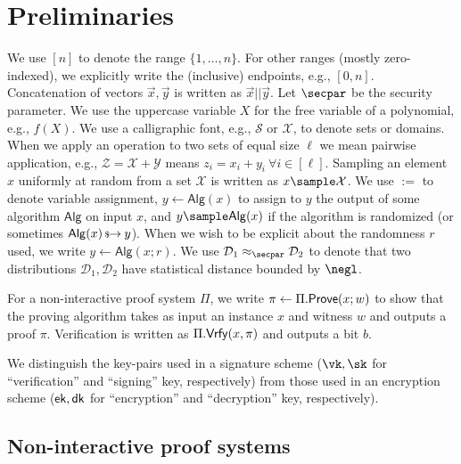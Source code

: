 \section{Preliminaries}\label{sec:prelims}

We use $[n]$ to denote the range $\{1, \dots, n\}$. For other ranges (mostly zero-indexed), we explicitly write the (inclusive) endpoints, e.g., $[0,n]$. 
Concatenation of vectors $\vec{x},\vec{y}$ is written as $\vec{x} || \vec{y}$. 
Let $\secpar$ be the security parameter.
We use the uppercase variable $X$ for the free variable of a polynomial, e.g., $f(X)$. 
We use a calligraphic font, e.g., $\mathcal{S}$ or $\mathcal{X}$, to denote sets or domains. When we apply an operation to two sets of equal size $\ell$ we mean pairwise application, e.g., $\mathcal{Z} = \mathcal{X} + \mathcal{Y}$ means $z_i = x_i + y_i~\forall{i \in [\ell]}$. 
Sampling an element $x$ uniformly at random from a set $\mathcal{X}$ is written as $x \sample \mathcal{X}$. 
We use $:=$ to denote variable assignment, $y \gets \mathsf{Alg}(x)$ to assign to $y$ the output of some algorithm $\mathsf{Alg}$ on input $x$, and $y \sample \mathsf{Alg}(x)$ if the algorithm is randomized (or sometimes $\mathsf{Alg}(x) \,{\mbox{\scriptsize${\$}$\normalsize}\!\!\to}\hskip2.3pt y$). When we wish to be explicit about the randomness $r$ used, we write $y \gets \mathsf{Alg}(x; r)$. We use $\mathcal{D}_1 \approx_\secpar \mathcal{D}_2$ to denote that two distributions $\mathcal{D}_1, \mathcal{D}_2$ have statistical distance bounded by $\negl$.

For a non-interactive proof system $\Pi$, we write $\pi \gets \Pi.\mathsf{Prove}(x; w)$ to show that the proving algorithm takes as input an instance $x$ and witness $w$ and outputs a proof $\pi$. Verification is written as $\Pi.\mathsf{Vrfy}(x, \pi)$ and outputs a bit $b$. 

We distinguish the key-pairs used in a signature scheme ($\vk, \sk$ for ``verification'' and ``signing'' key, respectively) from those used in an encryption scheme ($\mathsf{ek}, \mathsf{dk}$ for ``encryption'' and ``decryption'' key, respectively). 

\subsection{Non-interactive proof systems}\label{sec:nizks}

 


